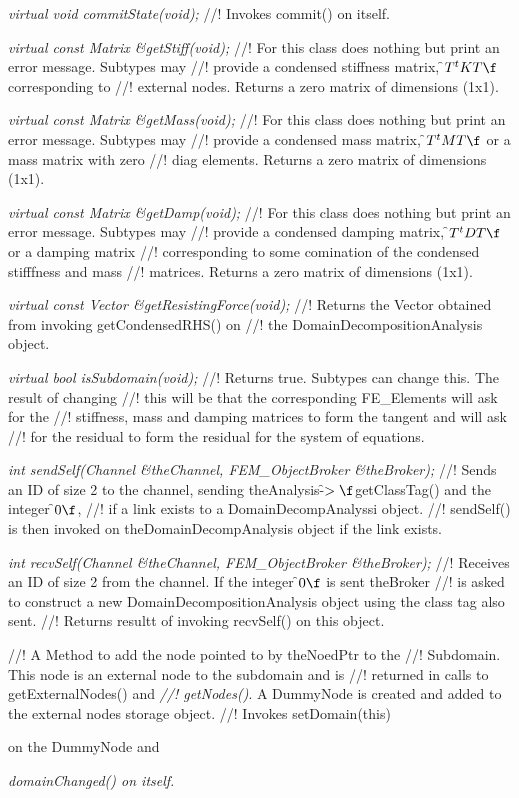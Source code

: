 {{\em virtual void commitState(void);} 
//! Invokes commit() on itself.
    
{\em virtual const Matrix \&getStiff(void);}
//! For this class does nothing but print an error message. Subtypes may
//! provide a condensed stiffness matrix, \f$T^tKT\f$ corresponding to
//! external nodes. Returns a zero matrix of dimensions (1x1).

{\em virtual const Matrix \&getMass(void);    }
//! For this class does nothing but print an error message. Subtypes may
//! provide a condensed mass matrix, \f$T^tMT\f$ or a mass matrix with zero
//! diag elements. Returns a zero matrix of dimensions (1x1).

{\em virtual const Matrix \&getDamp(void);    }
//! For this class does nothing but print an error message. Subtypes may
//! provide a condensed damping matrix, \f$T^tDT\f$ or a damping matrix
//! corresponding to some comination of the condensed stifffness and mass
//! matrices. Returns a zero matrix of dimensions (1x1).

{\em virtual const Vector \&getResistingForce(void);}
//! Returns the Vector obtained from invoking getCondensedRHS() on
//! the DomainDecompositionAnalysis object.

{\em virtual bool isSubdomain(void);}
//! Returns \p true. Subtypes can change this. The result of changing
//! this will be that the corresponding FE\_Elements will ask for the
//! stiffness, mass and damping matrices to form the tangent and will ask
//! for the residual to form the residual for the system of equations.

{\em int sendSelf(Channel \&theChannel, FEM\_ObjectBroker \&theBroker);}
//! Sends an ID of size 2 to the channel, sending theAnalysis-\f$>\f$getClassTag() and the integer \f$0\f$,
//! if a link exists to a DomainDecompAnalyssi object. 
//! sendSelf() is then invoked on theDomainDecompAnalysis object if the link exists.

{\em int recvSelf(Channel \&theChannel, FEM\_ObjectBroker \&theBroker);}
//! Receives an ID of size 2 from the channel. If the integer \f$0\f$ is sent \p theBroker
//! is asked to construct a new DomainDecompositionAnalysis object using the class tag also sent.
//! Returns resultt of invoking recvSelf() on this object.

//! A Method to add the node pointed to by \p theNoedPtr to the
//! Subdomain. This node is an external node to the subdomain and is
//! returned in calls to getExternalNodes() and {\em
//! getNodes()}. A DummyNode is created and added to the external nodes storage object. 
//! Invokes setDomain(this)} on the DummyNode and {\em domainChanged() on itself.

}
